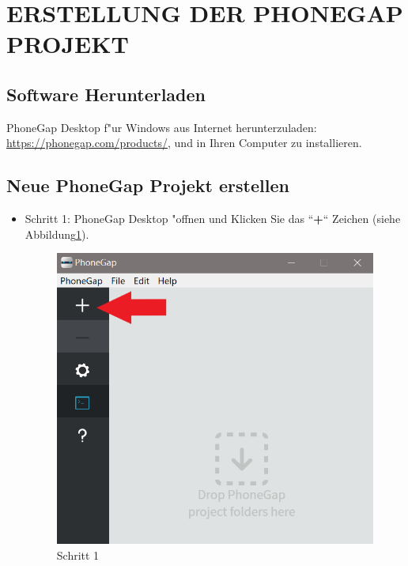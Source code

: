 \documentclass[a4paper,11pt,twoside]{article}
\begin{document}
\section{ERSTELLUNG DER PHONEGAP PROJEKT}
\subsection{Software Herunterladen}
PhoneGap Desktop f"ur Windows aus Internet herunterzuladen: \url{https://phonegap.com/products/}, und in Ihren Computer zu installieren.
\subsection{Neue PhoneGap Projekt erstellen}
\begin{itemize}
	\item Schritt 1: PhoneGap Desktop "offnen und Klicken Sie das ``\textbf{+}`` Zeichen (siehe Abbildung\ref{fig:preject1}).
\begin{figure}[h]
	\centering
	\includegraphics[width=\linewidth]{pic/project1}
	\caption{Schritt 1}\label{fig:preject1}
	\endminipage \hspace{2em}

\end{figure}
\end{itemize}
\end{document}

